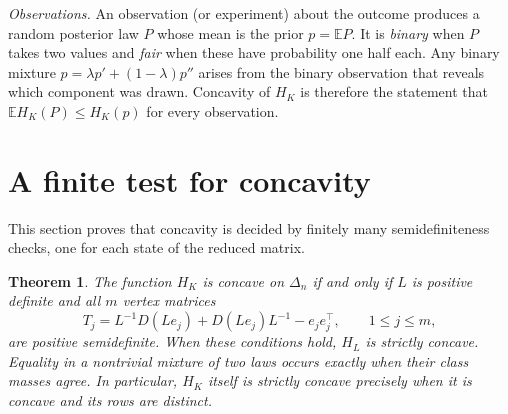 \documentclass[11pt,a4paper]{article}
\newtheorem{theorem}{Theorem}
\theoremstyle{remark}
\begin{document}
\emph{Observations.} An observation (or experiment) about the outcome produces a random posterior law $P$ whose mean is the prior $p=\mathbb E P$. It is \emph{binary} when $P$ takes two values and \emph{fair} when these have probability one half each. Any binary mixture $p=\lambda p'+(1-\lambda)p''$ arises from the binary observation that reveals which component was drawn. Concavity of $H_K$ is therefore the statement that $\mathbb E H_K(P)\le H_K(p)$ for every observation.

\section{A finite test for concavity}\label{sec:criterion}
This section proves that concavity is decided by finitely many semidefiniteness checks, one for each state of the reduced matrix.

\begin{theorem}\label{th:main}
The function $H_K$ is concave on $\Delta_n$ if and only if $L$ is positive definite and all $m$ \emph{vertex matrices}
\begin{equation}\label{eq:test}
 T_j=L^{-1}D(Le_j)+D(Le_j)L^{-1}-e_je_j^\top,\qquad 1\le j\le m,
\end{equation}
are positive semidefinite. When these conditions hold, $H_L$ is strictly concave. Equality in a nontrivial mixture of two laws occurs exactly when their class masses agree. In particular, $H_K$ itself is strictly concave precisely when it is concave and its rows are distinct.
\end{theorem}
\end{document}
